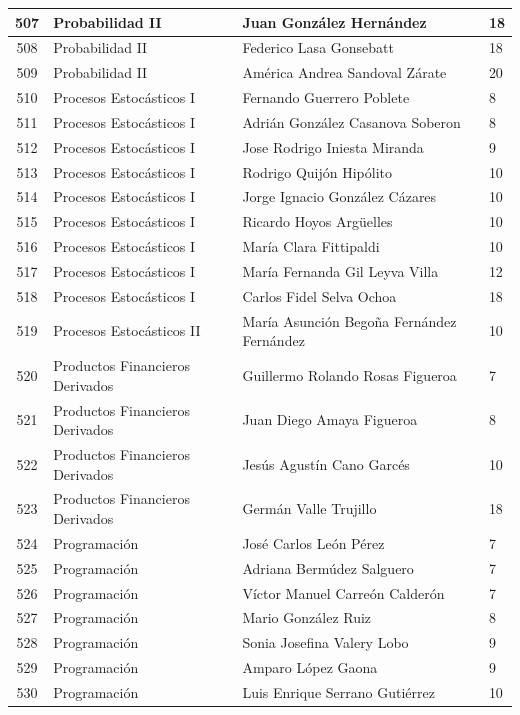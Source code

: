{\begin{longtable}{|c|p{6.5cm}|p{5cm}|p{1.5cm}|}
  507 & Probabilidad II & Juan González Hernández & 18 \\ \hline
  508 & Probabilidad II & Federico Lasa Gonsebatt & 18 \\ \hline
  509 & Probabilidad II & América Andrea Sandoval Zárate & 20 \\ \hline
  510 & Procesos Estocásticos I & Fernando Guerrero Poblete & 8 \\ \hline
  511 & Procesos Estocásticos I & Adrián González Casanova Soberon & 8 \\ \hline
  512 & Procesos Estocásticos I & Jose Rodrigo Iniesta Miranda & 9 \\ \hline
  513 & Procesos Estocásticos I & Rodrigo Quijón Hipólito & 10 \\ \hline
  514 & Procesos Estocásticos I & Jorge Ignacio González Cázares & 10 \\ \hline
  515 & Procesos Estocásticos I & Ricardo Hoyos Argüelles & 10 \\ \hline
  516 & Procesos Estocásticos I & María Clara Fittipaldi & 10 \\ \hline
  517 & Procesos Estocásticos I & María Fernanda Gil Leyva Villa & 12 \\ \hline
  518 & Procesos Estocásticos I & Carlos Fidel Selva Ochoa & 18 \\ \hline
  519 & Procesos Estocásticos II & María Asunción Begoña Fernández Fernández & 10 \\ \hline
  520 & Productos Financieros Derivados & Guillermo Rolando Rosas Figueroa & 7 \\ \hline
  521 & Productos Financieros Derivados & Juan Diego Amaya Figueroa & 8 \\ \hline
  522 & Productos Financieros Derivados & Jesús Agustín Cano Garcés & 10 \\ \hline
  523 & Productos Financieros Derivados & Germán Valle Trujillo & 18 \\ \hline
  524 & Programación & José Carlos León Pérez & 7 \\ \hline
  525 & Programación & Adriana Bermúdez Salguero & 7 \\ \hline
  526 & Programación & Víctor Manuel Carreón Calderón & 7 \\ \hline
  527 & Programación & Mario González Ruiz & 8 \\ \hline
  528 & Programación & Sonia Josefina Valery Lobo & 9 \\ \hline
  529 & Programación & Amparo López Gaona & 9 \\ \hline
  530 & Programación & Luis Enrique Serrano Gutiérrez & 10 \\ \hline

\end{longtable}}
